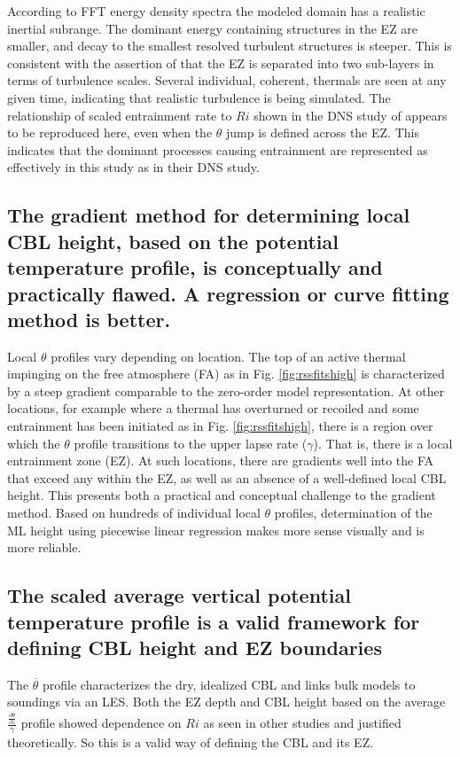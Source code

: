 According to FFT energy density spectra the modeled domain has a realistic inertial subrange.  The dominant energy containing structures in the EZ are smaller, and decay to the smallest resolved turbulent structures is steeper. This is consistent with the assertion of \cite{GarciaMellado} that the EZ is separated into two sub-layers in terms of turbulence scales.  Several individual, coherent, thermals are seen at any given time, indicating that realistic turbulence is being simulated.  The relationship of scaled entrainment rate to $Ri$ shown in the DNS study of \cite{GarciaMellado} appears to be reproduced here, even when the $\theta$ jump is defined across the EZ.  This indicates that the dominant processes causing entrainment are represented as effectively in this study as in their DNS study.

\subsection{The gradient method for determining local CBL height, based on the potential temperature profile, is conceptually and practically flawed.  A regression or curve fitting method is better.}

Local $\theta$ profiles vary depending on location.  The top of an active thermal impinging on the free atmosphere (FA) as in Fig. \ref{fig:rssfitshigh} is characterized by a steep gradient comparable to the zero-order model representation.  At other locations, for example where a thermal has overturned or recoiled and some entrainment has been initiated as in Fig. \ref{fig:rssfitshigh}, there is a region over which the $\theta$ profile transitions to the upper lapse rate ($\gamma$). That is, there is a local entrainment zone (EZ).  At such locations, there are gradients well into the FA that exceed any within the EZ, as well as an absence of a well-defined local CBL height.  This presents both a practical and conceptual challenge to the gradient method.  Based on hundreds of individual local $\theta$ profiles, determination of the ML height using piecewise linear regression makes more sense visually and is more reliable. 

\subsection{The scaled average vertical potential temperature profile is a valid framework for defining CBL height and EZ boundaries}

The $\overline{\theta}$ profile characterizes the dry, idealized CBL and links bulk models to soundings via an LES.  Both the EZ depth and CBL height based on the average $\frac{\frac{\partial \overline{\theta}}{\partial z}}{\gamma}$ profile showed dependence on $Ri$ as seen in other studies and justified theoretically.  So this is a valid way of defining the CBL and its EZ.  

